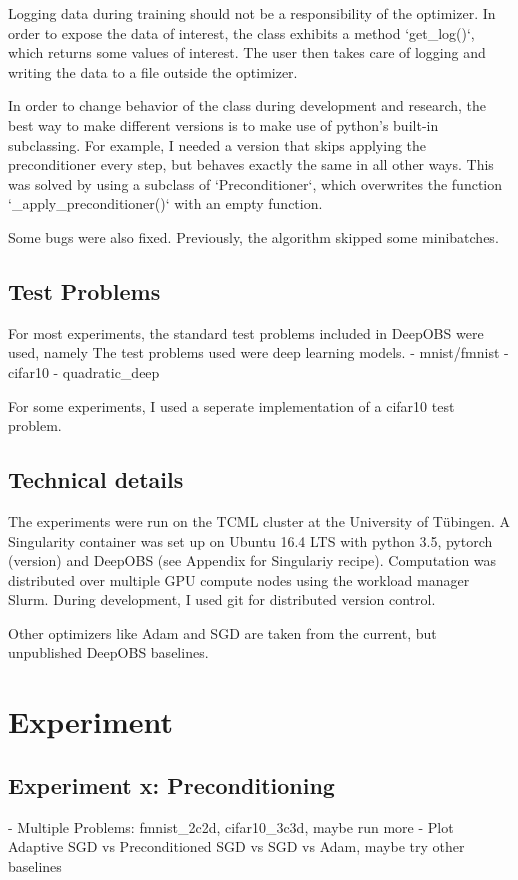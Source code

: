 \documentclass[twoside,12pt,a4paper]{report}
\begin{document}
\begin{markdown}
Logging data during training should not be a responsibility of the optimizer. In order to expose the data of interest, the class exhibits a method `get_log()`, which returns some values of interest. The user then takes care of logging and writing the data to a file outside the optimizer.

In order to change behavior of the class during development and research, the best way to make different versions is to make use of python's built-in subclassing. For example, I needed a version that skips applying the preconditioner every step, but behaves exactly the same in all other ways. This was solved by using a subclass of `Preconditioner`, which overwrites the function `_apply_preconditioner()` with an empty function.

Some bugs were also fixed. Previously, the algorithm skipped some minibatches.
\end{markdown}


\section{Test Problems}
For most experiments, the standard test problems included in DeepOBS were used, namely
The test problems used were deep learning models.
- mnist/fmnist
- cifar10
- quadratic\_deep

For some experiments, I used a seperate implementation of a cifar10 test problem.

\section{Technical details}
The experiments were run on the TCML cluster at the University of Tübingen.
A Singularity container was set up on Ubuntu 16.4 LTS with python 3.5, pytorch (version) and DeepOBS (see Appendix for Singulariy recipe).
Computation was distributed over multiple GPU compute nodes using the workload manager Slurm.
During development, I used git for distributed version control.

Other optimizers like Adam and SGD are taken from the current, but unpublished DeepOBS baselines.


\chapter{Experiment}
\section{Experiment x: Preconditioning}
- Multiple Problems: fmnist\_2c2d, cifar10\_3c3d, maybe run more
- Plot Adaptive SGD vs Preconditioned SGD vs SGD vs Adam, maybe try other baselines
\end{document}
